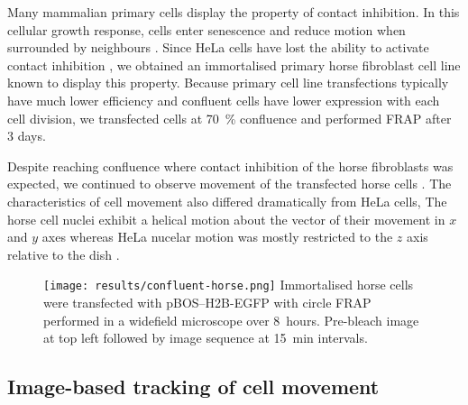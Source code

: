
    Many mammalian primary cells display the property of contact inhibition.
    In this cellular growth response, cells enter senescence and reduce motion
    when surrounded by neighbours \citep{abercrombie1970contact}.
    Since HeLa cells have
    lost the ability to activate contact inhibition
    \citep{stephenson1982locomotory},
    we obtained an immortalised primary horse fibroblast cell line known to display this property.
    Because primary cell line transfections typically have much lower efficiency
    and confluent cells have lower expression with each cell division,
    we transfected cells at \SI{70}{\percent} confluence and performed FRAP after 3 days.

    Despite reaching confluence where contact inhibition of the horse fibroblasts was expected, 
    we continued to observe movement of the transfected horse cells .
    The characteristics of cell movement also differed dramatically from HeLa cells,
    The horse cell nuclei exhibit a helical motion about the vector of their movement 
    in $x$ and $y$ axes 
    whereas HeLa nucelar motion was mostly restricted to the $z$ axis relative to the dish .

    \begin{figure}
      \centering
      \texttt{[image: results/confluent-horse.png]}
        {
          Immortalised horse cells were transfected with pBOS--H2B-EGFP
          with circle FRAP performed in a widefield microscope over 8~hours.
          Pre-bleach image at top left followed by image sequence at 15~min intervals.
        }
      \label{fig:kill-frap:confluent-horse}
    \end{figure}

    \subsection{Image-based tracking of cell movement}

